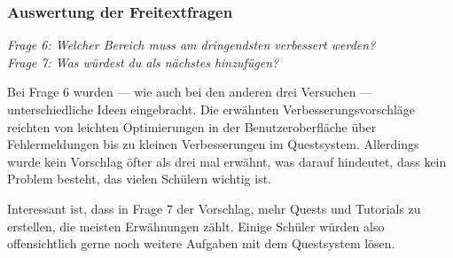 \subsubsection*{Auswertung der Freitextfragen}

\emph{Frage 6: Welcher Bereich muss am dringendsten verbessert werden?\\
Frage 7: Was würdest du als nächstes hinzufügen?}

Bei Frage 6 wurden --- wie auch bei den anderen drei Versuchen --- unterschiedliche Ideen eingebracht. Die erwähnten Verbesserungsvorschläge reichten von leichten Optimierungen in der Benutzeroberfläche über Fehlermeldungen bis zu kleinen Verbesserungen im Questsystem. Allerdings wurde kein Vorschlag öfter als drei mal erwähnt, was darauf hindeutet, dass kein Problem besteht, das vielen Schülern wichtig ist.

Interessant ist, dass in Frage 7 der Vorschlag, mehr Quests und Tutorials zu erstellen, die meisten Erwähnungen zählt. Einige Schüler würden also offensichtlich gerne noch weitere Aufgaben mit dem Questsystem lösen.

